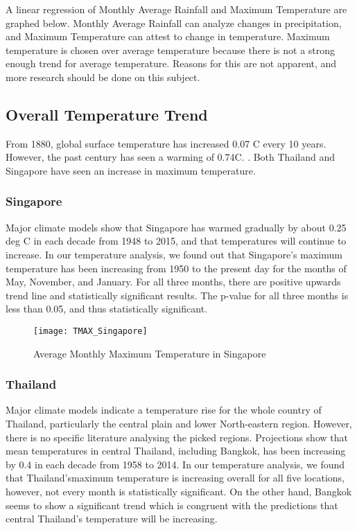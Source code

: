 A linear regression of Monthly Average Rainfall and Maximum Temperature are graphed below. Monthly Average Rainfall can analyze changes in precipitation, and Maximum Temperature can attest to change in temperature. Maximum temperature is chosen over average temperature because there is not a strong enough trend for average temperature. Reasons for this are not apparent, and more research should be done on this subject.  

\subsection{Overall Temperature Trend}
From 1880, global surface temperature has increased 0.07 \degree C every 10 years. However, the past century has seen a warming of 0.74\degree C. \citep{tempincrease}. Both Thailand and Singapore have seen an increase in maximum temperature.

\subsubsection{Singapore}
Major climate models show that Singapore has warmed gradually by about 0.25 deg C in each decade from 1948 to 2015, and that temperatures will continue to increase. In our temperature analysis, we found out that Singapore's maximum temperature has been increasing from 1950 to the present day for the months of May, November, and January. For all three months, there are positive upwards trend line and statistically significant results. The p-value for all three months is less than 0.05, and thus statistically significant. \citep{singaporeweather}

\begin{figure}[h!]
\centering
  \texttt{[image: TMAX\_Singapore]}
  \caption{Average Monthly Maximum Temperature in Singapore}
  \label{fig:TMAX_Singapore}
\end{figure}

\subsubsection{Thailand}

Major climate models indicate a temperature rise for the whole country of Thailand, particularly the central plain and lower North-eastern region. However, there is no specific literature analysing the picked regions. Projections show that mean temperatures in central Thailand, including Bangkok, has been increasing by 0.4 in each decade from 1958 to 2014. In our temperature analysis, we found that Thailand'smaximum temperature is increasing overall for all five locations, however, not every month is statistically significant. On the other hand, Bangkok seems to show a significant trend which is congruent with the predictions that central Thailand's temperature will be increasing.  \citep{bkkweather}

